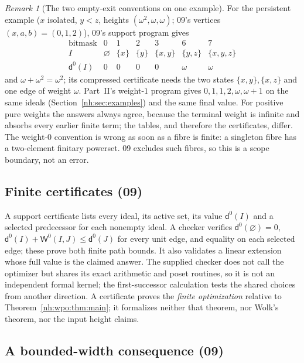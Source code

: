 \documentclass[11pt,a4paper]{article}
\theoremstyle{definition}
\theoremstyle{remark}
\newtheorem{remark}[theorem]{Remark}
\newcommand{\Wz}{\mathsf W^{0}}
\begin{document}
\begin{remark}[The two empty-exit conventions on one example]
\label{nh:wpo:rem:conventions}
For the persistent example ($x$ isolated, $y<z$, heights
$(\omega^2,\omega,\omega)$; 09's vertices $(x,a,b)=(0,1,2)$), 09's support
program gives
\[
\begin{array}{c|cccccc}
 \text{bitmask}&0&1&2&3&6&7\\ \hline
 I&\varnothing&\{x\}&\{y\}&\{x,y\}&\{y,z\}&\{x,y,z\}\\
 \mathsf d^0(I)&0&0&0&0&\omega&\omega
\end{array}
\]
and $\omega+\omega^2=\omega^2$; its compressed certificate needs the two states
$\{x,y\},\{x,z\}$ and one edge of weight $\omega$. Part~II's weight-$1$ program
gives $0,1,1,2,\omega,\omega+1$ on the same ideals
(Section~\ref{nh:sec:examples}) and the same final value. For positive pure
weights the answers always agree, because the terminal weight is infinite and
absorbs every earlier finite term; the tables, and therefore the certificates,
differ. The weight-$0$ convention is wrong as soon as a fibre is finite: a
singleton fibre has a two-element finitary powerset. 09 excludes such fibres, so
this is a scope boundary, not an error.
\end{remark}

\subsection{Finite certificates (09)}

A support certificate lists every ideal, its active set, its value
$\mathsf d^0(I)$ and a selected predecessor for each nonempty ideal. A checker
verifies $\mathsf d^0(\varnothing)=0$, $\mathsf d^0(I)+\Wz(I,J)\le\mathsf d^0(J)$
for every unit edge, and equality on each selected edge; these prove both finite
path bounds. It also validates a linear extension whose full value is the claimed
answer. The supplied checker does not call the optimizer but shares its exact
arithmetic and poset routines, so it is not an independent formal kernel; the
first-successor calculation tests the shared choices from another direction. A
certificate proves the \emph{finite optimization} relative to
Theorem~\ref{nh:wpo:thm:main}; it formalizes neither that theorem, nor Wolk's
theorem, nor the input height claims.

\subsection{A bounded-width consequence (09)}
\end{document}
